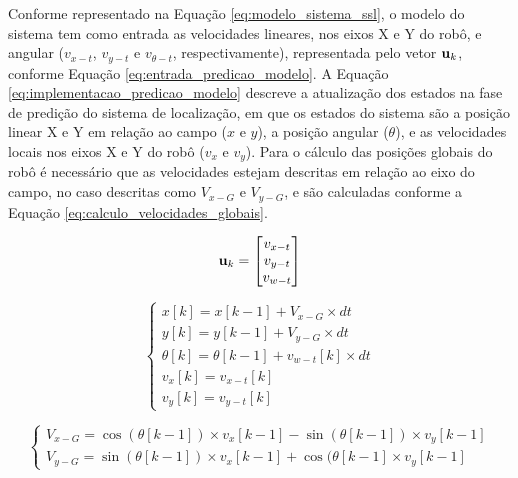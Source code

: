 \documentclass[acronym, symbols, table]{fei}
\begin{document}
				Conforme representado na Equação \ref{eq:modelo_sistema_ssl}, o modelo do sistema tem como entrada as velocidades lineares, nos eixos X e Y do robô, e angular ($v_{x-t}$, $v_{y-t}$ e $v_{\theta-t}$, respectivamente), representada pelo vetor $\text{\textbf{u}}_k$, conforme Equação \ref{eq:entrada_predicao_modelo}. A Equação \ref{eq:implementacao_predicao_modelo} descreve a atualização dos estados na fase de predição do sistema de localização, em que os estados do sistema são a posição linear X e Y em relação ao campo ($x$ e $y$), a posição angular ($\theta$), e as velocidades locais nos eixos X e Y do robô ($v_x$ e $v_y$). Para o cálculo das posições globais do robô é necessário que as velocidades estejam descritas em relação ao eixo do campo, no caso descritas como $V_{x-G}$ e $V_{y-G}$, e são calculadas conforme a Equação \ref{eq:calculo_velocidades_globais}.
				
				\begin{equation}\label{eq:entrada_predicao_modelo}
					\text{\textbf{u}}_k =
					\begin{bmatrix}
						v_{x-t} \\
						v_{y-t} \\
						v_{w-t}
					\end{bmatrix}
				\end{equation}
				
				\begin{equation}\label{eq:implementacao_predicao_modelo}
					\begin{cases}
						x[k] = x[k-1] + V_{x-G} \times dt \\
						y[k] = y[k-1] + V_{y-G} \times dt  \\
						\theta[k] = \theta[k-1] + v_{w-t}[k] \times dt \\
						v_x[k] = v_{x-t}[k]\\
						v_y[k] = v_{y-t}[k]
					\end{cases}
				\end{equation}
			
			\begin{equation}\label{eq:calculo_velocidades_globais}
				\begin{cases}
					V_{x-G} = \cos(\theta[k-1]) \times v_x[k-1] - \sin(\theta[k-1]) \times v_y[k-1] \\
					V_{y-G} = \sin(\theta[k-1]) \times v_x[k-1] + \cos(\theta[k-1] \times v_y[k-1]
				\end{cases}	
			\end{equation}
			
\end{document}
